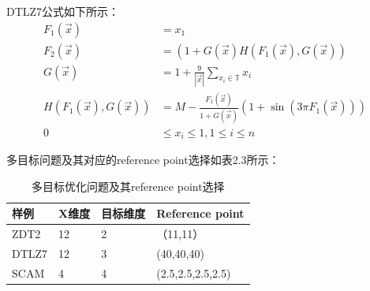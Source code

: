 DTLZ7公式如下所示：
\begin{equation}
\begin{aligned} F _ { 1 } ( \vec { x } ) & = x _ { 1 } \\ F _ { 2 } ( \vec { x } ) & = \left( 1 + G ( \vec { x } ) H \left( F _ { 1 } ( \vec { x } ) , G ( \vec { x } ) \right) \right. \\ G ( \vec { x } ) & = 1 + \frac { 9 } { | \vec { x } | } \sum _ { x _ { i } \in \mathbb { T } } x _ { i } \\ H \left( F _ { 1 } ( \vec { x } ) , G ( \vec { x } ) \right) & = M - \frac { F _ { 1 } ( \vec { x } ) } { 1 + G ( \vec { x } ) } \left( 1 + \sin \left( 3 \pi F _ { 1 } ( \vec { x } ) \right) \right) \\ 0 & \leq x _ { i } \leq 1,1 \leq i \leq n \end{aligned}
\end{equation}

多目标问题及其对应的reference point选择如表2.3所示：
\begin{table}[H]
\centering
\caption{多目标优化问题及其reference point选择}  
\begin{tabular}{llll}
\toprule[1.5pt]
样例 & X维度 & 目标维度 & Reference point\\  
\hline  
ZDT2    & 12 & 2 & （11,11）   \\
DTLZ7 & 12 & 3 & (40,40,40)  \\
SCAM & 4 & 4 & (2.5,2.5,2.5,2.5)   \\
\bottomrule[1.5pt]  
\end{tabular}  
\end{table}  

